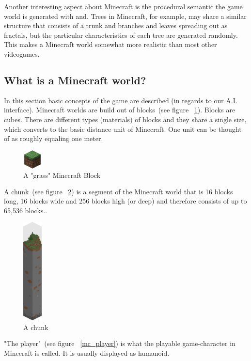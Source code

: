 Another interesting aspect about Minecraft is the procedural semantic the game world is generated with and. Trees in Minecraft, for example, may share a similar structure that consists of a trunk and branches and leaves spreading out as fractals, but the particular characteristics of each tree are generated randomly. This makes a Minecraft world somewhat more realistic than most other videogames.

        \subsection{What is a Minecraft world?}
In this section basic concepts of the game are described (in regards to our A.I. interface). Minecraft worlds are build out of blocks~(see figure ~\ref{mc_block}). Blocks are cubes. There are different types (materials) of blocks and they share a single size, which converts to the basic distance unit of Minecraft. One unit can be thought of as roughly equaling one meter.

\begin{figure}[h]
  \centering
    \includegraphics[width=1cm]{graphics/block}
  \caption{A "grass" Minecraft Block}
  \label{mc_block}
\end{figure}
        
A chunk~(see figure ~\ref{mc_chunk}) is a segment of the Minecraft world that is 16 blocks long, 16 blocks wide and 256 blocks high (or deep) and therefore consists of up to 65,536 blocks..~\cite{mcwiki_chunks}

\begin{figure}[h]
  \centering
    \includegraphics[width=1cm]{graphics/chunk}
  \caption{A chunk}
  \label{mc_chunk}
\end{figure}

"The player"~(see figure ~\ref{mc_player}) is what the playable game-character in Minecraft is called. It is usually displayed as humanoid.


